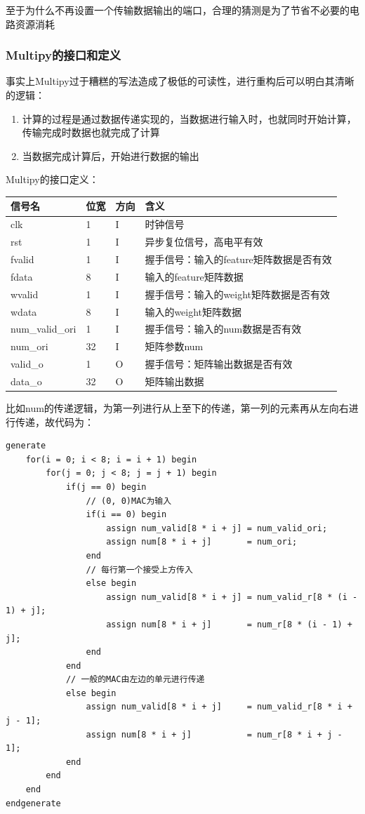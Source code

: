 \documentclass[12pt,a4paper]{article}
\begin{document}
至于为什么不再设置一个传输数据输出的端口，合理的猜测是为了节省不必要的电路资源消耗

\subsubsection{Multipy的接口和定义}

事实上Multipy过于糟糕的写法造成了极低的可读性，进行重构后可以明白其清晰的逻辑：

\begin{enumerate}
\item
  计算的过程是通过数据传递实现的，当数据进行输入时，也就同时开始计算，传输完成时数据也就完成了计算
\item
  当数据完成计算后，开始进行数据的输出
\end{enumerate}

Multipy的接口定义：

\begin{longtable}[]{@{}l|l|l|l@{}}
\toprule\noalign{}
信号名 & 位宽 & 方向 & 含义 \\
\midrule\noalign{}
\endhead
\bottomrule\noalign{}
\endlastfoot
clk & 1 & I & 时钟信号 \\
rst & 1 & I & 异步复位信号，高电平有效 \\
fvalid & 1 & I & 握手信号：输入的feature矩阵数据是否有效 \\
fdata & 8 & I & 输入的feature矩阵数据 \\
wvalid & 1 & I & 握手信号：输入的weight矩阵数据是否有效 \\
wdata & 8 & I & 输入的weight矩阵数据 \\
num\_valid\_ori & 1 & I & 握手信号：输入的num数据是否有效 \\
num\_ori & 32 & I & 矩阵参数num \\
valid\_o & 1 & O & 握手信号：矩阵输出数据是否有效 \\
data\_o & 32 & O & 矩阵输出数据 \\
\end{longtable}

比如num的传递逻辑，为第一列进行从上至下的传递，第一列的元素再从左向右进行传递，故代码为：

\begin{lstlisting}
generate
    for(i = 0; i < 8; i = i + 1) begin
        for(j = 0; j < 8; j = j + 1) begin
            if(j == 0) begin
                // (0, 0)MAC为输入
                if(i == 0) begin
                    assign num_valid[8 * i + j] = num_valid_ori;
                    assign num[8 * i + j]       = num_ori;
                end
                // 每行第一个接受上方传入
                else begin
                    assign num_valid[8 * i + j] = num_valid_r[8 * (i - 1) + j];
                    assign num[8 * i + j]       = num_r[8 * (i - 1) + j];
                end
            end
            // 一般的MAC由左边的单元进行传递
            else begin
                assign num_valid[8 * i + j]     = num_valid_r[8 * i + j - 1];
                assign num[8 * i + j]           = num_r[8 * i + j - 1];
            end
        end
    end
endgenerate
\end{lstlisting}
\end{document}
